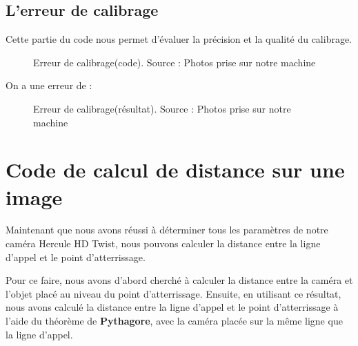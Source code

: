 \subsection{L'erreur de calibrage}

Cette partie du code nous permet d'évaluer la précision et la qualité du calibrage.

\begin{figure}[H]%
	\center%
	\setlength{\fboxsep}{5pt}%
	\setlength{\fboxrule}{0.5pt}%
	\caption[Erreur de calibrage(code)]{Erreur de calibrage(code). Source : Photos prise sur notre machine}
	\label{fig:Erreur de calibrage(code)}
\end{figure}

 
On a une erreur de :


\begin{figure}[H]%
	\center%
	\setlength{\fboxsep}{5pt}%
	\setlength{\fboxrule}{0.5pt}%
	\caption[ Erreur de calibrage(résultat)]{Erreur de calibrage(résultat). Source : Photos prise sur notre machine}
	\label{fig:Erreur de calibrage(résultat)}
\end{figure}


\section{Code de calcul de distance sur une image}
 
 Maintenant que nous avons réussi à déterminer tous les paramètres de notre caméra Hercule HD Twist, nous pouvons calculer la distance entre la ligne d'appel et le point d'atterrissage.
 
 Pour ce faire, nous avons d'abord cherché à calculer la distance entre la caméra et l'objet placé au niveau du point d'atterrissage. Ensuite, en utilisant ce résultat, nous avons calculé la distance entre la ligne d'appel et le point d'atterrissage à l'aide du théorème de \textbf{Pythagore}, avec la caméra placée sur la même ligne que la ligne d'appel.
 

